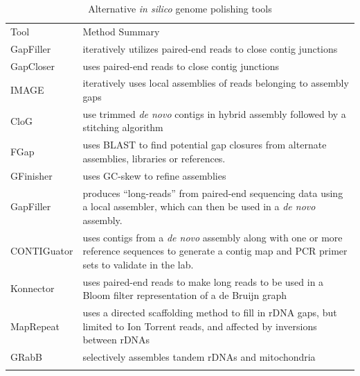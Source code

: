 \documentclass[10pt]{article}
\makeatletter
\newcommand{\ra}[1]{\renewcommand{\arraystretch}{#1}}
\newcommand{\cmidrules}[1]{%
  \noalign{%
    \global\MD@cmidrules={}%
    \toks@={\cmidrule(l{.3\tabcolsep}r{.3\tabcolsep})}%
    \count@=\z@
    \loop\ifnum\count@<#1\relax
      \advance\count@\@ne
      \edef\MD@temp{\the\toks@{\the\count@-\the\count@}}%
      \global\MD@cmidrules\expandafter{\the\expandafter\MD@cmidrules\MD@temp}%
    \repeat
  }%
  \the\MD@cmidrules
}
\makeatother
\begin{document}
\begin{linenumbers}
\begin{table}[!h]
\centering
\ra{1.3}
\caption{Alternative \textit{\textit{in silico}} genome polishing tools}
\label{table:tools}
\begin{tabular}{p{2.6cm}p{11cm}}
  \toprule
  Tool &  Method Summary \\
  \cmidrules{2}
  GapFiller\cite{Boetzer2012} & iteratively utilizes paired-end reads to close contig junctions \\
    \arrayrulecolor{lgray}\hline
  GapCloser\cite{Luo2012} & uses paired-end reads to close contig junctions \\
  \hline
  IMAGE \cite{Tsai2010} & iteratively uses local assemblies of reads belonging to  assembly gaps \\
  \hline
  CloG \cite{Yang2011} & use trimmed \textit{de novo} contigs in hybrid assembly followed by a stitching algorithm \\
  \hline
  FGap \cite{Piro2014,Guizelini2016} & uses BLAST to find potential gap closures from alternate assemblies, libraries or references. \\
  \hline
  GFinisher \cite{Guizelini2016} & uses GC-skew to refine assemblies \\
  \hline
  GapFiller \cite{Nadalin2012} &  produces ``long-reads'' from paired-end sequencing data using a local assembler, which can then be used in a \textit{de novo} assembly. \\
  \hline
  CONTIGuator\cite{Galardini2011} & uses contigs from a \textit{de novo} assembly along with one or more reference sequences to generate a contig map and PCR primer sets to validate in the lab. \\
  \hline
  Konnector\cite{Vandervalk2015} & uses paired-end reads to make long reads to be used in a Bloom filter representation of a de Bruijn graph \\
  \hline
  MapRepeat\cite{Mariano2015} & uses a directed scaffolding method to fill in rDNA gaps, but limited to Ion Torrent reads, and affected by inversions between rDNAs \cite{Mariano2016} \\
  \hline
  GRabB\cite{Brankovics2016} & selectively assembles tandem rDNAs and mitochondria\\
    \arrayrulecolor{black}
  \bottomrule
\end{tabular}

\end{table}
\end{linenumbers}
\end{document}
